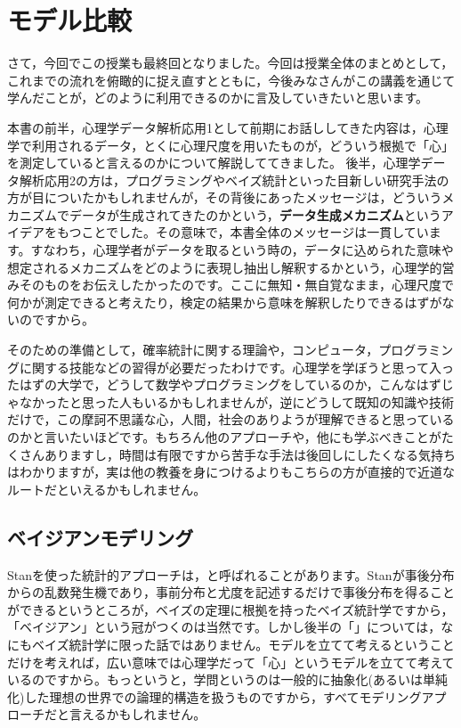 \documentclass{ltjsbook}
\begin{document}
\chapter{モデル比較}
\label{x30_comparison}
さて，今回でこの授業も最終回となりました。今回は授業全体のまとめとして，これまでの流れを俯瞰的に捉え直すとともに，今後みなさんがこの講義を通じて学んだことが，どのように利用できるのかに言及していきたいと思います。

本書の前半，心理学データ解析応用1として前期にお話ししてきた内容は，心理学で利用されるデータ，とくに心理尺度を用いたものが，どういう根拠で「心」を測定していると言えるのかについて解説しててきました。
後半，心理学データ解析応用2の方は，プログラミングやベイズ統計といった目新しい研究手法の方が目についたかもしれませんが，その背後にあったメッセージは，どういうメカニズムでデータが生成されてきたのかという，\textbf{データ生成メカニズム}というアイデアをもつことでした。その意味で，本書全体のメッセージは一貫しています。すなわち，心理学者がデータを取るという時の，データに込められた意味や想定されるメカニズムをどのように表現し抽出し解釈するかという，心理学的営みそのものをお伝えしたかったのです。ここに無知・無自覚なまま，心理尺度で何かが測定できると考えたり，検定の結果から意味を解釈したりできるはずがないのですから。

そのための準備として，確率統計に関する理論や，コンピュータ，プログラミングに関する技能などの習得が必要だったわけです。心理学を学ぼうと思って入ったはずの大学で，どうして数学やプログラミングをしているのか，こんなはずじゃなかったと思った人もいるかもしれませんが，逆にどうして既知の知識や技術だけで，この摩訶不思議な心，人間，社会のありようが理解できると思っているのかと言いたいほどです。もちろん他のアプローチや，他にも学ぶべきことがたくさんありますし，時間は有限ですから苦手な手法は後回しにしたくなる気持ちはわかりますが，実は他の教養を身につけるよりもこちらの方が直接的で近道なルートだといえるかもしれません。

\section{ベイジアンモデリング}
Stanを使った統計的アプローチは，と呼ばれることがあります。Stanが事後分布からの乱数発生機であり，事前分布と尤度を記述するだけで事後分布を得ることができるというところが，ベイズの定理に根拠を持ったベイズ統計学ですから，「ベイジアン」という冠がつくのは当然です。しかし後半の「」については，なにもベイズ統計学に限った話ではありません。モデルを立てて考えるということだけを考えれば，広い意味では心理学だって「心」というモデルを立てて考えているのですから。もっというと，学問というのは一般的に抽象化(あるいは単純化)した理想の世界での論理的構造を扱うものですから，すべてモデリングアプローチだと言えるかもしれません。
\end{document}
